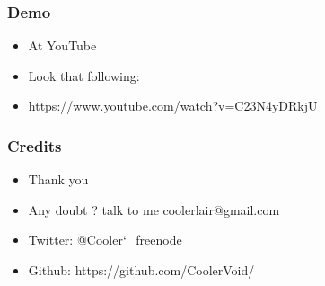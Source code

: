 \documentclass[serif,mathserif]{beamer}
\begin{document}
\begin{frame}
  \frametitle{Demo}
  \begin{itemize}
  \item At YouTube
  \item Look that following:
  \item https://www.youtube.com/watch?v=C23N4yDRkjU
  \end{itemize}
\end{frame}

\begin{frame}
  \frametitle{Credits}
  \begin{itemize}
  \item Thank you
  \item Any doubt ? talk to me coolerlair@gmail.com
  \item Twitter: @Cooler\char`_freenode
  \item Github: https://github.com/CoolerVoid/
  \end{itemize}
\end{frame}
\end{document}
